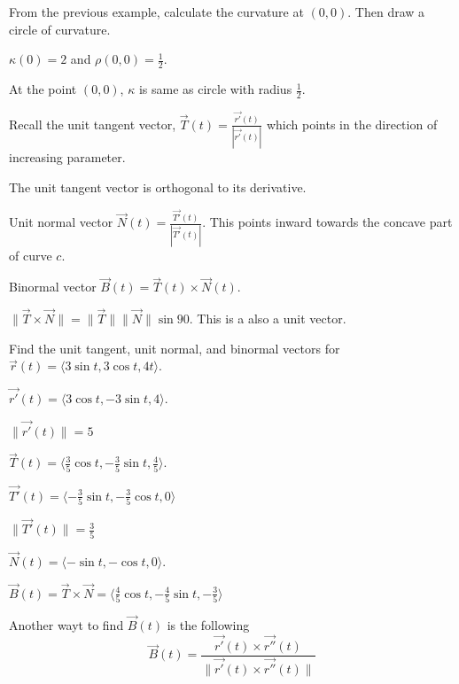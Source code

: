 \documentclass[../calc3.tex]{subfiles}
\begin{document}
\begin{example}
    From the previous example, calculate the curvature at $(0,0)$. Then draw a circle of curvature.

    $\kappa(0)=2$ and $\rho(0,0)=\frac{1}{2}$.

    At the point $(0,0)$, $\kappa$ is same as circle with radius $\frac{1}{2}$.
\end{example}

Recall the unit tangent vector, $\vec{T}(t)=\frac{\vec{r'}(t)}{|\vec{r'}(t)|}$ which points in the direction of increasing parameter.

The unit tangent vector is orthogonal to its derivative.

Unit normal vector $\vec{N}(t)=\frac{\vec{T'}(t)}{|\vec{T'}(t)|}$. This points inward towards the concave part of curve $c$.

Binormal vector $\vec{B}(t) = \vec{T}(t)\times \vec{N}(t)$. 

$\| \vec{T}\times \vec{N}\| = \| \vec{T}\| \| \vec{N}\| \sin 90$. This is a also a unit vector.

\begin{example}
    Find the unit tangent, unit normal, and binormal vectors for $\vec{r}(t)=\langle 3\sin t, 3\cos t, 4t\rangle$.

    $\vec{r'}(t)=\langle 3\cos t, -3\sin t,4\rangle$.

    $\| \vec{r'}(t)\| = 5$

    $\vec{T}(t)=\langle \frac{3}{5}\cos t,-\frac{3}{5}\sin t, \frac{4}{5}\rangle$.

    $\vec{T'}(t)=\langle -\frac{3}{5}\sin t, -\frac{3}{5}\cos t,0\rangle$

    $\| \vec{T'}(t)\| = \frac{3}{5}$

    $\vec{N}(t)=\langle -\sin t,-\cos t,0 \rangle$.

    $\vec{B}(t)=\vec{T}\times \vec{N} =\langle \frac{4}{5}\cos t, -\frac{4}{5}\sin t,-\frac{3}{5}\rangle$
\end{example}

Another wayt to find $\vec{B}(t)$ is the following 
\[ \vec{B}(t)=\frac{\vec{r'}(t)\times \vec{r''}(t)}{\| \vec{r'}(t)\times \vec{r''}(t)\|} \]
\end{document}
